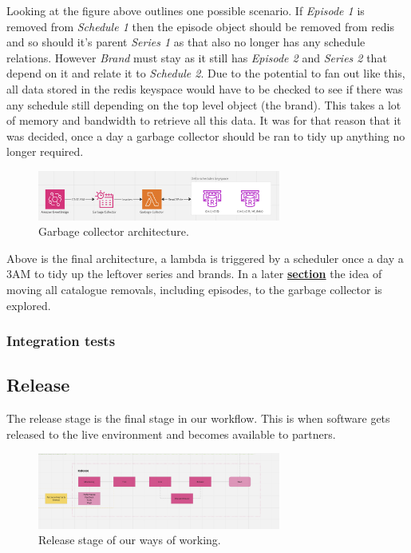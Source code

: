   Looking at the figure above outlines one possible scenario. If \emph{Episode 1} is removed from \emph{Schedule 1} then the episode object should be removed
  from redis and so should it's parent \emph{Series 1} as that also no longer has any schedule relations. However \emph{Brand} must stay as it still
  has \emph{Episode 2} and \emph{Series 2} that depend on it and relate it to \emph{Schedule 2}. Due to the potential to fan out like this, all data stored
  in the redis keyspace would have to be checked to see if there was any schedule still depending on the top level object (the brand). This takes a lot of
  memory and bandwidth to retrieve all this data. It was for that reason that it was decided, once a day a garbage collector should be ran to 
  tidy up anything no longer required.

  \begin{figure}[H]
    \centering
    \includegraphics[width=8cm]{assets/architectures/garbageCollector.png}
    \caption{Garbage collector architecture.}
    \label{fig:garbageCollectorArchitecture}
  \end{figure}

  Above is the final architecture, a lambda is triggered by a scheduler once a day a 3AM to tidy up the leftover series and brands. In a later
  \hyperref[sec:conclusion]{\textbf{section}} the idea of moving all catalogue removals, including episodes, to the garbage collector is explored.

  \newpage
  \subsubsection{Integration tests}

  \newpage
  \subsection{Release}
  The release stage is the final stage in our workflow. This is when software gets released to the live environment and becomes available to partners. 
  \begin{figure}[H]
    \centering
    \includegraphics[width=8cm]{assets/workflow/release.png}
    \caption{Release stage of our ways of working.}
    \label{fig:workflowRelease}
  \end{figure}
  
